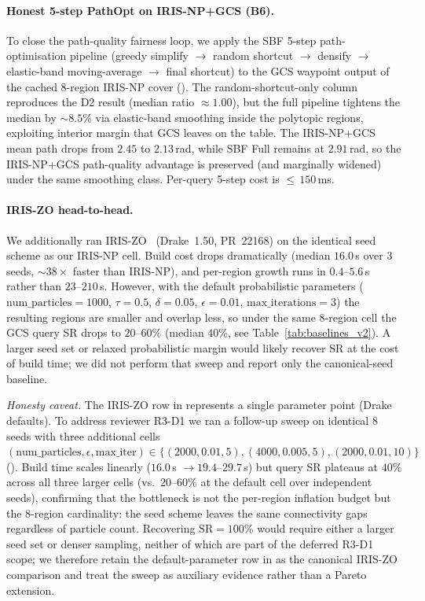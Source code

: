 \documentclass[journal]{IEEEtran}
\begin{document}
\paragraph{Honest 5-step PathOpt on IRIS-NP+GCS (B6).}
To close the path-quality fairness loop, we apply the SBF 5-step
path-optimisation pipeline (greedy simplify $\to$ random shortcut
$\to$ densify $\to$ elastic-band moving-average $\to$ final shortcut)
to the GCS waypoint output of the cached 8-region IRIS-NP cover
(). The random-shortcut-only column
reproduces the D2 result (median ratio $\approx 1.00$), but the
full pipeline tightens the median by $\sim 8.5\%$ via elastic-band
smoothing inside the polytopic regions, exploiting interior margin
that GCS leaves on the table. The IRIS-NP+GCS mean path drops from
$2.45$ to $2.13$\,rad, while SBF Full remains at $2.91$\,rad, so
the IRIS-NP+GCS path-quality advantage is preserved (and marginally
widened) under the same smoothing class. Per-query 5-step cost is
${\le}\,150$\,ms.


\paragraph{IRIS-ZO head-to-head.} We additionally ran
IRIS-ZO~\cite{werner2024irisze} (Drake~1.50, PR~22168) on the
identical seed scheme as our IRIS-NP cell. Build cost drops
dramatically (median $16.0$\,s over 3 seeds, ${\sim}38{\times}$
faster than IRIS-NP), and per-region growth runs in
$0.4$--$5.6$\,s rather than $23$--$210$\,s. However, with the
default probabilistic parameters
($\text{num\_particles}=1000$, $\tau=0.5$, $\delta=0.05$,
$\epsilon=0.01$, $\text{max\_iterations}=3$) the resulting regions
are smaller and overlap less, so under the same
$8$-region cell the GCS query SR drops to $20$--$60\%$
(median $40\%$, see Table~\ref{tab:baselines_v2}). A larger seed
set or relaxed probabilistic margin would likely recover SR at the
cost of build time; we did not perform that sweep and report only
the canonical-seed baseline.

\emph{Honesty caveat.} The IRIS-ZO row in
 represents a single
parameter point (Drake defaults). To address reviewer R3-D1 we ran a
follow-up sweep on identical 8 seeds with three additional cells
$(\text{num\_particles},\epsilon,\text{max\_iter})\!\in\!\{(2000,0.01,5),
(4000,0.005,5),(2000,0.01,10)\}$
(). Build time scales linearly
($16.0$\,s $\to 19.4$--$29.7$\,s) but query SR plateaus at
$40\%$ across all three larger cells (vs.\ $20$--$60\%$ at the
default cell over independent seeds), confirming that the bottleneck
is not the per-region inflation budget but the 8-region cardinality:
the seed scheme leaves the same connectivity gaps regardless of
particle count. Recovering $\text{SR}=100\%$ would require either a
larger seed set or denser sampling, neither of which are part of the
deferred R3-D1 scope; we therefore retain the default-parameter row in
 as the canonical IRIS-ZO comparison and treat
the sweep as auxiliary evidence rather than a Pareto extension.
\end{document}
